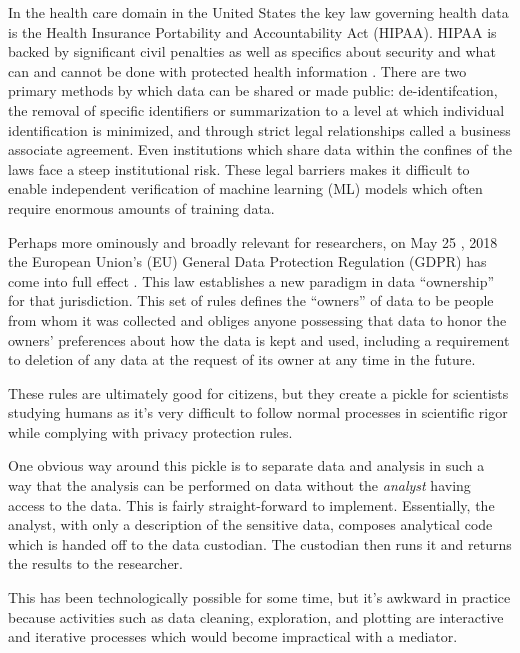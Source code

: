 \documentclass{article}
\begin{document}
In the health care domain in the United States the key law governing health data is the Health Insurance Portability and Accountability Act (HIPAA). HIPAA is backed by significant civil penalties as well as specifics about security and what can and cannot be done with protected health information \cite{hippaviol}. There are two primary methods by which data can be shared or made public: de-identifcation, the removal of specific identifiers or summarization to a level at which individual identification is minimized, and through strict legal relationships called a business associate agreement. Even institutions which share data within the confines of the laws face a steep institutional risk. These legal barriers makes it difficult to enable independent verification of machine learning (ML) models which often require enormous amounts of training data.

Perhaps more ominously and broadly relevant for researchers, on May 25 , 2018 the European Union's (EU) General Data Protection Regulation (GDPR) has come into full effect \cite{gdpr}. This law establishes a new paradigm in data ``ownership'' for that jurisdiction. This set of rules defines the ``owners'' of data to be people from whom it was collected and obliges anyone possessing that data to honor the owners' preferences about how the data is kept and used, including a requirement to deletion of any data at the request of its owner at any time in the future.

These rules are ultimately good for citizens, but they create a pickle for scientists studying humans as it's very difficult to follow normal processes in scientific rigor while complying with privacy protection rules.

One obvious way around this pickle is to separate data and analysis in such a way that the analysis can be performed on data without the \emph{analyst} having access to the data. This is fairly straight-forward to implement. Essentially, the analyst, with only a description of the sensitive data, composes analytical code which is handed off to the data custodian. The custodian then runs it and returns the results to the researcher.

This has been technologically possible for some time, but it's awkward in practice because activities such as data cleaning, exploration, and plotting are interactive and iterative processes which would become impractical with a mediator.

\end{document}

